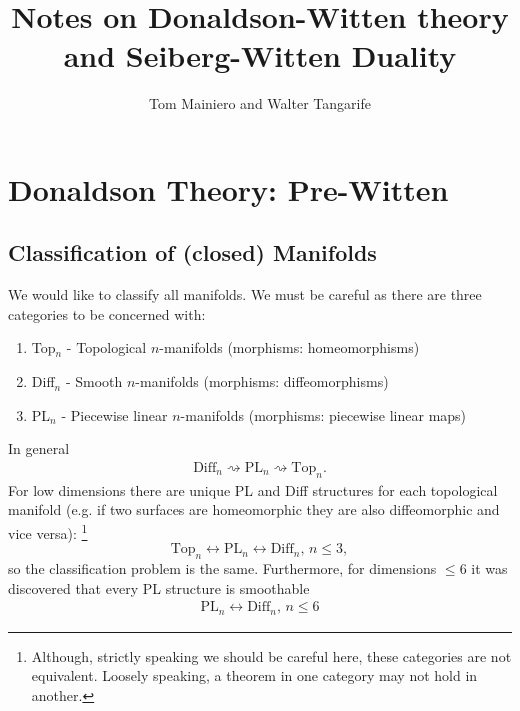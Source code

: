 \documentclass[12pt, onecolumn]{article}
\begin{document}
\title{Notes on Donaldson-Witten theory and Seiberg-Witten Duality}
\author{Tom Mainiero and Walter Tangarife}
\date{}
\maketitle

\tableofcontents

\section{Donaldson Theory: Pre-Witten}
\subsection{Classification of (closed) Manifolds}
We would like to classify all manifolds.   We must be careful as there are three categories to be concerned with:
\begin{enumerate}
\item Top$_{n}$ - Topological $n$-manifolds (morphisms: homeomorphisms)
\item Diff$_{n}$ - Smooth $n$-manifolds (morphisms: diffeomorphisms)
\item PL$_{n}$ - Piecewise linear $n$-manifolds (morphisms: piecewise linear maps)
\end{enumerate}
In general
\begin{align*}
\text{Diff}_{n} \rightsquigarrow \text{PL}_{n} \rightsquigarrow \text{Top}_{n}.
\end{align*}
For low dimensions there are unique PL and Diff structures for each topological manifold (e.g. if two surfaces are homeomorphic they are also diffeomorphic and vice versa): \footnote{Although, strictly speaking we should be careful here, these categories are not equivalent.  Loosely speaking, a theorem in one category may not hold in another.}
\begin{equation*}
\text{Top}_{n} \leftrightarrow \text{PL}_{n} \leftrightarrow \text{Diff}_{n} \text{, $n \leq 3$},
\end{equation*}
so the classification problem is the same.  Furthermore, for dimensions $\leq 6$ it was discovered that every PL structure is smoothable
\begin{align*}
\text{PL}_{n} \leftrightarrow \text{Diff}_{n} \text{, $n \leq 6$}
\end{align*}

\vspace{5mm}
\end{document}
